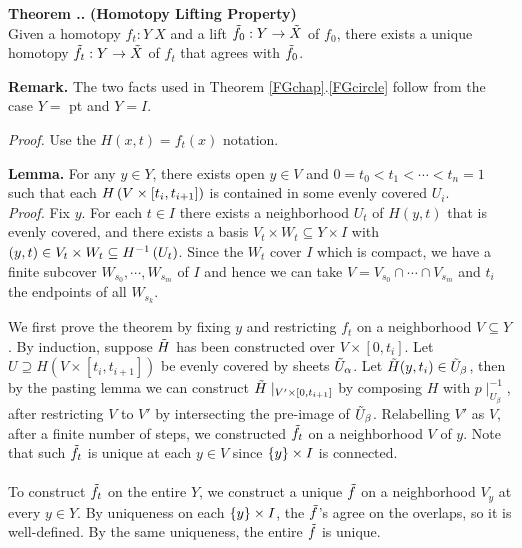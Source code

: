 \documentclass{natsirt}
\newcommand{\x}{\\ \phantom{a} \\}
\newcounter{def}[section]
\newcounter{thm}[section]
\newenvironment{thmbox}[1][]{
\begin{greenbox}[#1]\refstepcounter{thm}\textbf{Theorem \thesection.\thethm. }}{\end{greenbox}}
\begin{document}
\begin{thmbox}
    \textbf{(Homotopy Lifting Property)}\\
    Given a homotopy $f_t:Y \> X$ and a lift $\Tilde{f}_0: Y \> \Tilde{X}$ of $f_0$, there exists a unique homotopy $\Tilde{f}_t: Y\>\Tilde{X}$ of $f_t$ that agrees with $\Tilde{f}_0$.
\end{thmbox}
\begin{whitebox}
    \textbf{Remark.} The two facts used in Theorem \ref{FGchap}.\ref{FGcircle} follow from the case $Y=$ pt and $Y=I$.
\end{whitebox}
\textit{Proof.} Use the $H(x,t) = f_t(x)$ notation.
\begin{whitebox}
    \textbf{Lemma.} For any $y\in Y$, there exists open $y\in V$ and $0=t_0 < t_1 <\cdots< t_n=1$ such that each $H\pr{V\times [t_i,t_{i+1}]}$ is contained in some evenly covered $U_i$.\vspace{0.3cm}\\
    \textit{Proof.} Fix $y$. For each $t\in I$ there exists a neighborhood $U_t$ of $H(y,t)$ that is evenly covered, and there exists a basis $V_t\times W_t \subseteq Y\times I$ with $(y,t)\in V_t\times W_t \subseteq H^{-1}\pr{U_t}$. Since the $W_t$ cover $I$ which is compact, we have a finite subcover $W_{s_0},\cdots,W_{s_m}$ of $I$ and hence we can take $V = V_{s_0}\cap \cdots \cap V_{s_m}$ and $t_i$ the endpoints of all $W_{s_k}$.
\end{whitebox}
We first prove the theorem by fixing $y$ and restricting $f_t$ on a neighborhood $V\subseteq Y$. By induction, suppose $\Tilde{H}$ has been constructed over $V\times[0,t_i]$. Let $U\supseteq H(V\times [t_i,t_{i+1}])$ be evenly covered by sheets $\Tilde{U}_\alpha$. Let $\Tilde{H}(y,t_i)\in \Tilde{U}_\beta$, then by the pasting lemma we can construct $\Tilde{H}\mid_{V'\times [0,t_{i+1}]}$ by composing $H$ with $p\mid_{U_\beta}^{-1}$, after restricting $V$ to $V'$ by intersecting the pre-image of $\Tilde{U}_\beta$. Relabelling $V'$ as $V$, after a finite number of steps, we constructed $\Tilde{f}_t$ on a neighborhood $V$ of $y$. Note that such $\Tilde{f}_t$ is unique at each $y\in V$ since $\set{y}\times I$ is connected.
\x
To construct $\Tilde{f}_t$ on the entire $Y$, we construct a unique $\Tilde{f}$ on a neighborhood $V_y$ at every $y\in Y$. By uniqueness on each $\set{y}\times I$, the $\Tilde{f}$'s agree on the overlaps, so it is well-defined. By the same uniqueness, the entire $\Tilde{f}$ is unique.\QED
\end{document}
